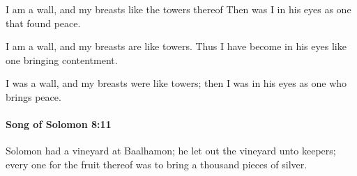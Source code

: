 			\begin{versebox}
					\item[BHS] 
					\item[LXX] 
					\item[ASV] I am a wall, and my breasts like the towers thereof Then was I in his eyes as one that found peace.
					\item[NIV] I am a wall, and my breasts are like towers. Thus I have become in his eyes like one bringing contentment.
					\item[NRSV] I was a wall, and my breasts were like towers; then I was in his eyes as one who brings peace.
			\end{versebox}

		\paragraph{Song of Solomon 8:11} %
			\label{SONGOFSOLOMON-8-11}

			Solomon had a vineyard at Baalhamon; he let out the vineyard unto keepers; every one for the fruit thereof was to bring a thousand pieces of silver.

